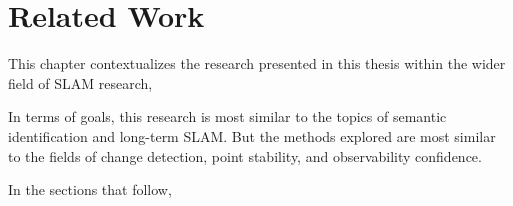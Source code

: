 \section{Related Work}
\label{sec:related_work}

This chapter contextualizes the research presented in this thesis within the wider field of SLAM research, 

In terms of goals, this research is most similar to the topics of semantic identification and long-term SLAM. But the methods explored are most similar to the fields of change detection, point stability, and observability confidence.

In the sections that follow,
% 